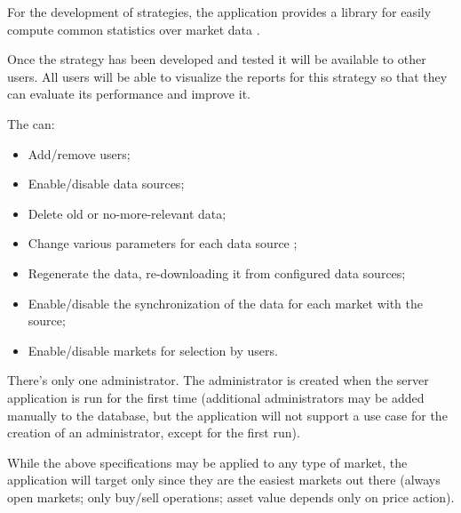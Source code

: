 For the development of strategies, the application provides a library for easily
compute common statistics over market data .

Once the strategy has been developed and tested it will be available to other
users. All users will be able to visualize the reports for this strategy so that
they can evaluate its performance and improve it.

The  can:
\begin{itemize}
	\item Add/remove users;
	\item Enable/disable data sources;
	\item Delete old or no-more-relevant data;
	\item Change various parameters for each data source ;
	\item Regenerate the data, re-downloading it from configured data
		sources;
	\item Enable/disable the synchronization of the data for each market
		with the source;
	\item Enable/disable markets for selection by users.
\end{itemize}

There's only one administrator. The administrator is created when the server
application is run for the first time (additional administrators may be added
manually to the database, but the application will not support a use case for
the creation of an administrator, except for the first run).

While the above specifications may be applied to any type of market, the
application will target only  since they are
the easiest markets out there (always open markets; only buy/sell operations;
asset value depends only on price action).
